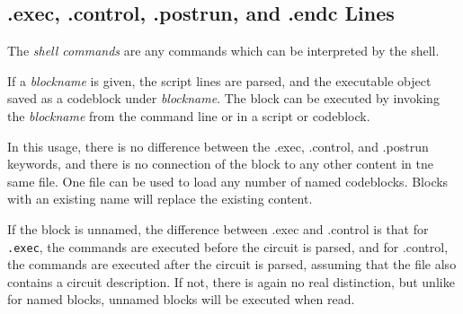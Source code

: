\subsection{{\vt .exec}, {\vt .control}, {\vt .postrun}, and {\vt .endc} Lines}
\label{control}


The {\it shell commands} are any commands which can be interpreted by
the {\WRspice} shell.

If a {\it blockname} is given, the script lines are parsed, and the
executable object saved as a codeblock under {\it blockname\/}.  The
block can be executed by invoking the {\it blockname} from the command
line or in a script or codeblock.

In this usage, there is no difference between the {\vt .exec}, {\vt
.control}, and {\vt .postrun} keywords, and there is no connection of
the block to any other content in tne same file.  One file can be used
to load any number of named codeblocks.  Blocks with an existing name
will replace the existing content.

If the block is unnamed, the difference between {\vt .exec} and {\vt
.control} is that for {\tt .exec}, the commands are executed before
the circuit is parsed, and for {\vt .control}, the commands are
executed after the circuit is parsed, assuming that the file also
contains a circuit description.  If not, there is again no real
distinction, but unlike for named blocks, unnamed blocks will be
executed when read.


